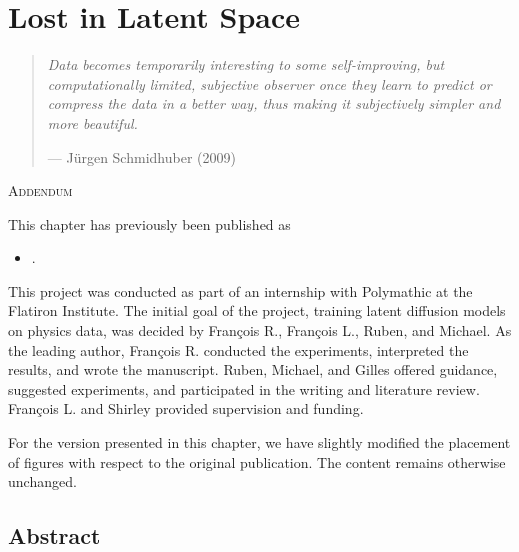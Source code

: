 \chapter{Lost in Latent Space} \label{chap:lola}

\begin{quote}
    \textit{Data becomes temporarily interesting to some self-improving, but computationally limited, subjective observer once they learn to predict or compress the data in a better way, thus making it subjectively simpler and more beautiful.}

    \begin{flushright}
        --- Jürgen Schmidhuber (2009) \nocite{schmidhuber2009driven}
    \end{flushright}
\end{quote}

\vspace{2em}

\begin{addendum}{\Large\scshape Addendum}

This chapter has previously been published as

\begin{itemize}[leftmargin=1em]
    \item[] .
\end{itemize}

This project was conducted as part of an internship with Polymathic at the Flatiron Institute. The initial goal of the project, training latent diffusion models on physics data, was decided by François R., François L., Ruben, and Michael. As the leading author, François R. conducted the experiments, interpreted the results, and wrote the manuscript. Ruben, Michael, and Gilles offered guidance, suggested experiments, and participated in the writing and literature review. François L. and Shirley provided supervision and funding.

For the version presented in this chapter, we have slightly modified the placement of figures with respect to the original publication. The content remains otherwise unchanged.

\end{addendum}

\section*{Abstract}

